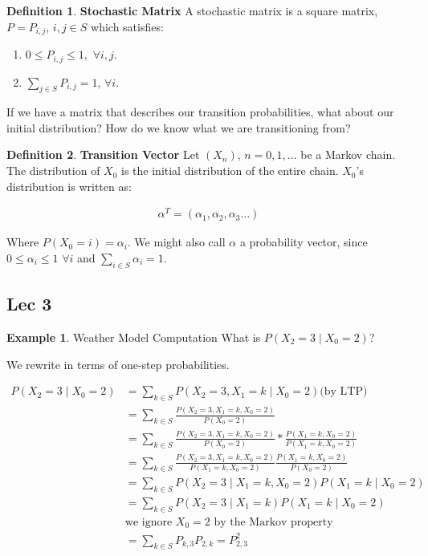 \documentclass[12pt]{article}
\theoremstyle{definition}
\newtheorem{definition}{Definition}[section]
\newtheorem{example}{Example}[section]
\begin{document}
\begin{definition}{\textbf{Stochastic Matrix}}
  A stochastic matrix is a square matrix, $P = P_{i,j}$, $i,j \in S$ which satisfies:
  \begin{enumerate}
    \item $ 0 \leq P_{i,j} \leq 1,$ $\forall i,j$.
    \item $\sum_{j \in S} P_{i,j} = 1$, $\forall i$.
  \end{enumerate}
\end{definition}

If we have a matrix that describes our transition probabilities, what about our initial distribution? How do we know what we are transitioning from?


\begin{definition}{\textbf{Transition Vector}}
  Let $(X_n)$, $ n = 0,1, \dots$ be a Markov chain. The distribution of $X_0$ is the initial distribution of the entire chain. $X_0$'s distribution is written as:

  \begin{align*}
    \alpha^T = (\alpha_1, \alpha_2, \alpha_3 \dots)
  \end{align*}

  Where $P(X_0 = i) = \alpha_i$. We might also call $\alpha$ a probability vector, since $ 0 \leq \alpha_i \leq 1$ $\forall i$ and $\sum_{i \in S} \alpha_i = 1$.
\end{definition}

\subsection{Lec 3}


\begin{example}{Weather Model Computation}
  What is $P(X_2 = 3 \mid X_0 = 2)$?

  We rewrite in terms of one-step probabilities.

  \begin{align*}
    P(X_2 = 3 \mid X_0 = 2) &= \sum_{k \in S}P(X_2 = 3, X_1 = k \mid  X_0 = 2) \text{(by LTP)} \\
    &=\sum_{k \in S} \frac{P(X_2 = 3, X_1 = k, X_0 = 2)}{P(X_0 = 2)} \\
    &=\sum_{k \in S} \frac{P(X_2 = 3, X_1 = k, X_0 = 2)}{P(X_0 = 2)} * \frac{P(X_1 = k, X_0 = 2)}{P(X_1 = k, X_0 = 2)} \\
    &=\sum_{k \in S} \frac{P(X_2 = 3, X_1 = k, X_0 = 2)}{P(X_1 = k, X_0 =2)} \frac{P(X_1 = k, X_0 = 2)}{P(X_0 = 2)} \\
    &= \sum_{k \in S} P(X_2 = 3 \mid X_1 = k, X_0 =2) P(X_1 = k \mid X_0 = 2) \\
    &= \sum_{k \in S} P(X_2 = 3 \mid X_1 = k) P(X_1 = k \mid X_0 = 2) \\
    &\text{we ignore $X_0 = 2$ by the Markov property} \\
    &= \sum_{k \in S} P_{k,3}P_{2,k} = P_{2,3}^2
  \end{align*}
\end{example}
\end{document}
